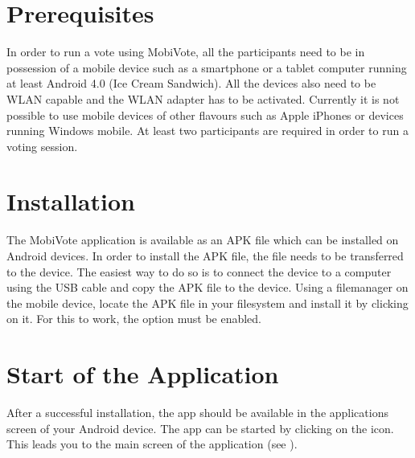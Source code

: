 \documentclass[numbers=noenddot, abstract=on, a4paper, headsepline,
footsepline, oneside, draft=off]{scrreprt}
\newcommand{\myref}[1]{(see \Vref{#1})}
\begin{document}
\section{Prerequisites}
In order to run a vote using MobiVote, all the participants need to be in
possession of a mobile device such as a smartphone or a tablet computer running
at least Android 4.0 (Ice Cream Sandwich). All the devices also need to be WLAN
capable and the WLAN adapter has to be activated. Currently it is not possible
to use mobile devices of other flavours such as Apple iPhones or devices running
Windows mobile. At least two participants are required in order to run a voting
session.

\section{Installation}
The MobiVote application is available as an APK file which can be installed on
Android devices. In order to install the APK file, the file needs to be
transferred to the device. The easiest way to do so is to connect the device to
a computer using the USB cable and copy the APK file to the device. Using a filemanager on
the mobile device, locate the APK file in your filesystem and install it by
clicking on it. For this to work, the option  must be enabled.

\section{Start of the Application}
After a successful installation, the app should be available in the applications
screen of your Android device. The app can be started by clicking on the icon.
This leads you to the main screen of the application
\myref{fig:handbook_mainscreen}.
\end{document}
